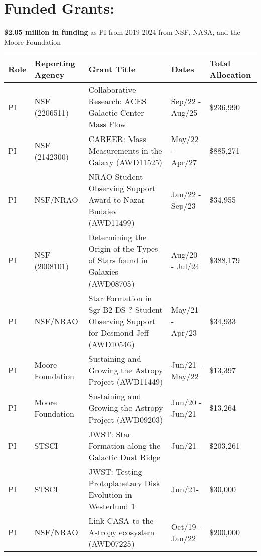 \begin{minipage}{\textwidth}
\section*{Funded Grants: }


    \textbf{\$2.05 million in funding} as PI from 2019-2024 from NSF, NASA, and the Moore Foundation \\

\begin{tabular}{lp{1.0in}p{2.5in}p{0.6in}p{0.6in}}
Role & Reporting Agency & Grant Title & Dates & Total \mbox{Allocation}  \\
\hline
PI & NSF (2206511) & Collaborative Research: ACES Galactic Center Mass Flow & Sep/22 - Aug/25 & \$236,990 \\
PI & NSF (2142300) & CAREER: Mass Measurements in the Galaxy (AWD11525) & May/22 - Apr/27 & \$885,271  \\
PI & NSF/NRAO & NRAO Student Observing Support Award to Nazar Budaiev (AWD11499) & Jan/22 - Sep/23 & \$34,955  \\
PI & NSF (2008101) & Determining the Origin of the Types of Stars found in Galaxies (AWD08705) & Aug/20 - Jul/24 & \$388,179  \\
PI & NSF/NRAO & Star Formation in Sgr B2 DS ? Student Observing Support for Desmond Jeff (AWD10546) & May/21 - Apr/23 & \$34,933   \\
PI & Moore Foundation & Sustaining and Growing the Astropy Project (AWD11449) & Jun/21 - May/22 & \$13,397   \\
PI & Moore Foundation & Sustaining and Growing the Astropy Project (AWD09203) & Jun/20 - Jun/21 & \$13,264   \\
PI & STSCI & JWST: Star Formation along the Galactic Dust Ridge & Jun/21- &  \$203,261 \\
PI & STSCI & JWST: Testing Protoplanetary Disk Evolution in Westerlund 1 & Jun/21- &  \$30,000 \\
PI & NSF/NRAO & Link CASA to the Astropy ecosystem (AWD07225) & Oct/19 - Jan/22 & \$200,000   \\
\end{tabular}
\end{minipage}
\vspace{4mm}
